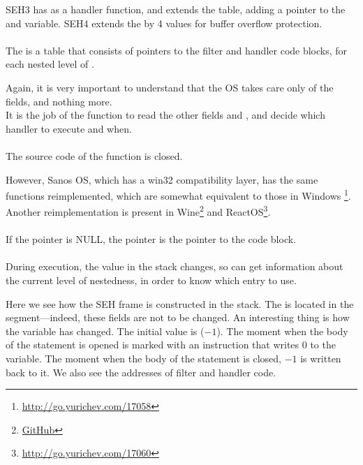 
SEH3 has  
as a handler function, and extends the  table, adding
a pointer to the  and  variable.
SEH4 extends the  
by 4 values for buffer overflow protection.\\
\\
The  is a table that consists of pointers to the filter and handler code blocks, for each nested level of .



Again, it is very important to understand that the \ac{OS} takes care only of the  fields, and nothing more.\\
It is the job of the  function to read the other fields and , and decide
which handler to execute and when.\\
\\
The source code of the  function is closed.

However, Sanos OS, which has a win32 compatibility layer, has the same
functions reimplemented, which are somewhat equivalent to those in Windows
\footnote{\url{http://go.yurichev.com/17058}}.
Another reimplementation is present in 
Wine\footnote{\href{http://go.yurichev.com/17059}{GitHub}}
and ReactOS\footnote{\url{http://go.yurichev.com/17060}}.\\
\\
If the  pointer is NULL, the  
pointer is the pointer to the  code block.\\
\\
During execution, the  value in the stack changes, so
 can get information about the current level of nestedness, 
in order to know which  entry to use.






Here we see how the SEH frame is constructed in the stack.
The  is located in the  segment---indeed, these fields are not to be changed.
An interesting thing is how the  variable has changed.
The initial value is  ($-1$).
The moment when the body of the  
statement is opened is marked with an instruction that writes 0 to the variable.
The moment when the body of the  statement is closed, $-1$ 
is written back to it.
We also see the addresses of filter and handler code.

